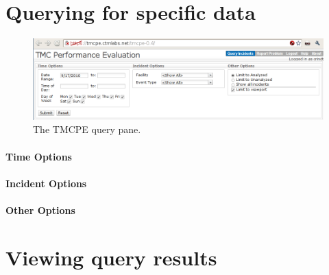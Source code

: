 \documentclass[12pt]{report}
\renewcommand{\fixme}[3][]{#1\xspace}
\newcounter{space}
\begin{document}
\fixme{crindt}{Discuss link to \url{http://tracker.ctmlabs.net}}


\section{Querying for specific data}
\label{sec:ui-query}

\begin{figure}[t]
  \begin{center}
    \includegraphics[width=\textwidth]{images/tmcpe-query.png}
    \caption{The TMCPE query pane.}
    \label{fig:tmcpe-query}
  \end{center}
\end{figure}

\fixme{crindt}{Query options and how to use them.  Note any quirks.}

\paragraph{Time Options}

\paragraph{Incident Options}

\paragraph{Other Options}




\section{Viewing query results}
\label{sec:ui-viewing}
\end{document}
